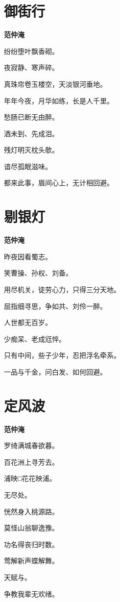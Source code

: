 \documentclass[12pt,a4paper]{ctexbook}
\begin{document}
\section{御街行}
\textbf{范仲淹}\par\vspace{0.5em}
纷纷堕叶飘香砌。\par
夜寂静、寒声碎。\par
真珠帘卷玉楼空，天淡银河垂地。\par
年年今夜，月华如练，长是人千里。\par
愁肠已断无由醉。\par
酒未到、先成泪。\par
残灯明灭枕头欹。\par
谙尽孤眠滋味。\par
都来此事，眉间心上，无计相回避。\par

\section{剔银灯}
\textbf{范仲淹}\par\vspace{0.5em}
昨夜因看蜀志。\par
笑曹操、孙权、刘备。\par
用尽机关，徒劳心力，只得三分天地。\par
屈指细寻思，争如共、刘伶一醉。\par
人世都无百岁。\par
少痴呆、老成尩悴。\par
只有中间，些子少年，忍把浮名牵系。\par
一品与千金，问白发、如何回避。\par

\section{定风波}
\textbf{范仲淹}\par\vspace{0.5em}
罗绮满城春欲暮。\par
百花洲上寻芳去。\par
浦映□花花映浦。\par
无尽处。\par
恍然身入桃源路。\par
莫怪山翁聊逸豫。\par
功名得丧归时数。\par
莺解新声蝶解舞。\par
天赋与。\par
争教我辈无欢绪。\par
\end{document}
